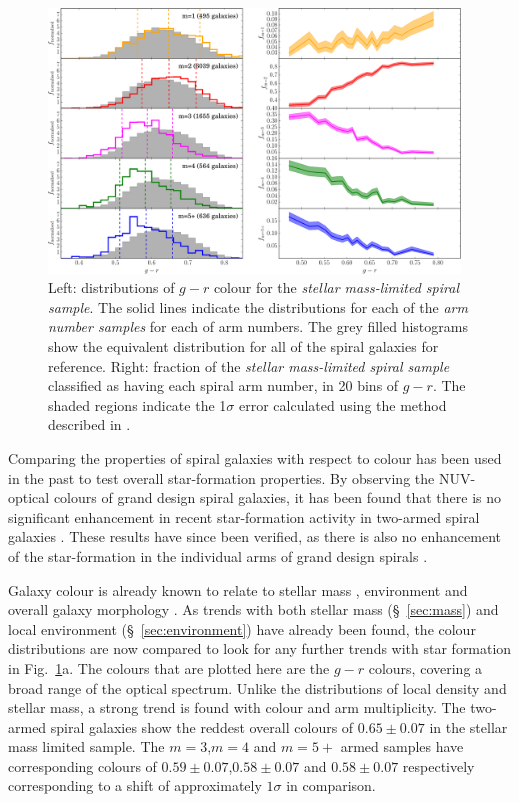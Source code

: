 \documentclass[useAMS,usenatbib]{mn2e}
\begin{document}
\begin{figure}
		\centering

        \includegraphics[width=0.975\textwidth]{Images/Results/colour_plots.pdf}

        \caption{Left: distributions of $g-r$ colour for the \textit{stellar mass-limited spiral sample}. The solid lines indicate the distributions for each of the \textit{arm number samples} for each of arm numbers. The grey filled histograms show the equivalent distribution for all of the spiral galaxies for reference. Right: fraction of the \textit{stellar mass-limited spiral sample} classified as having each spiral arm number, in 20 bins of $g-r$. The shaded regions indicate the 1$\sigma$ error calculated using the method described in \citet{Cameron_11}.}

        \label{fig:colour_plots}

\end{figure}

Comparing the properties of spiral galaxies with respect to colour has been used in the past to test overall star-formation properties. By observing the NUV-optical colours of grand design spiral galaxies, it has been found that there is no significant enhancement in recent star-formation activity in two-armed spiral galaxies \citep{Romanishin_85,EE_86}. These results have since been verified, as there is also no enhancement of the star-formation in the individual arms of grand design spirals \citep{Foyle_11,Choi_15}. 

Galaxy colour is already known to relate to stellar mass \citep{Baldry_06}, environment \citep{Baldry_04} and overall galaxy morphology \citep{Bamford_09}. As trends with both stellar mass (\S~\ref{sec:mass}) and local environment (\S~\ref{sec:environment}) have already been found, the colour distributions are now compared to look for any further trends with star formation in Fig.~\ref{fig:colour_plots}a. The colours that are plotted here are the $g-r$ colours, covering a broad range of the optical spectrum. Unlike the distributions of local density and stellar mass, a strong trend is found with colour and arm multiplicity. The two-armed spiral galaxies show the reddest overall colours of $0.65 \pm 0.07$ in the stellar mass limited sample. The $m=3$,$m=4$ and $m=5+$ armed samples have corresponding colours of $0.59 \pm 0.07$,$0.58 \pm 0.07$ and $0.58 \pm 0.07$ respectively corresponding to a shift of approximately $1\sigma$ in comparison.
\end{document}
